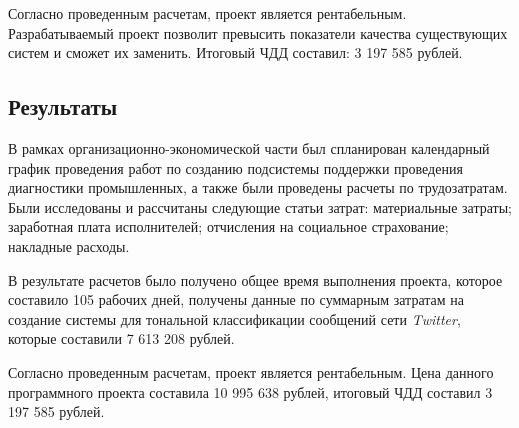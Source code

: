         Согласно проведенным расчетам, проект является рентабельным.
        Разрабатываемый проект позволит превысить показатели качества существующих
        систем и сможет их заменить. Итоговый ЧДД составил: 3 197 585 рублей.

    \subsection{Результаты}
        В рамках организационно-экономической части был спланирован календарный
        график проведения работ по созданию подсистемы поддержки проведения
        диагностики промышленных, а также были проведены расчеты по трудозатратам.
        Были исследованы и рассчитаны следующие статьи затрат: материальные затраты;
        заработная плата исполнителей; отчисления на социальное страхование;
        накладные расходы.

        В результате расчетов было получено общее время выполнения проекта,
        которое составило 105 рабочих дней, получены данные по суммарным затратам
        на создание системы для тональной классификации сообщений сети
        {\it Twitter}, которые составили 7 613 208 рублей.

        Согласно проведенным расчетам, проект является рентабельным.
        Цена данного программного проекта составила 10 995 638 рублей, итоговый
        ЧДД составил 3 197 585 рублей.
